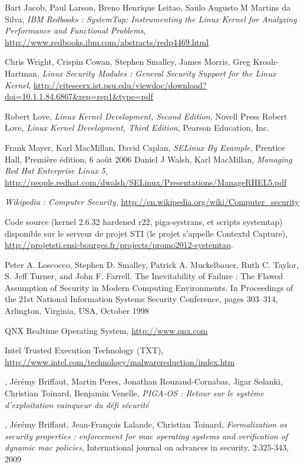 \documentclass[pdftex,a4paper,titlepage,11pt]{article}
\begin{document}
\begin{thebibliography}{40}

 Bart Jacob, Paul Larson, Breno Henrique Leitao, Saulo Augusto M Martins da Silva, \textit{IBM Redbooks : SystemTap: Instrumenting the Linux Kernel for Analyzing Performance and Functional Problems}, \url{http://www.redbooks.ibm.com/abstracts/redp4469.html}

 Chris Wright, Crispin Cowan, Stephen Smalley, James Morris, Greg Kroah-Hartman, \textit{Linux Security Modules : General Security Support for the Linux Kernel}, \url{http://citeseerx.ist.psu.edu/viewdoc/download?doi=10.1.1.84.6867&rep=rep1&type=pdf}

 Robert Love, \textit{Linux Kernel Development, Second Edition}, Novell Press
 Robert Love, \textit{Linux Kernel Development, Third Edition}, Pearson Education, Inc.

 Frank Mayer, Karl MacMillan, David Caplan, \textit{SELinux By Example}, Prentice Hall, Première édition, 6 août 2006
 Daniel J Walsh, Karl MacMillan, \textit{Managing Red Hat Enterprise Linux 5}, \url{http://people.redhat.com/dwalsh/SELinux/Presentations/ManageRHEL5.pdf}

 \textit{Wikipedia : Computer Security}, \url{http://en.wikipedia.org/wiki/Computer_security}

 Code source (kernel 2.6.32 hardened r22, piga-systrans, et scripts systemtap) disponible sur le serveur de projet STI (le projet s'appelle Contextd Capture), \url{http://projetsti.ensi-bourges.fr/projects/promo2012-systemtap}.

 Peter A. Loscocco, Stephen D. Smalley, Patrick A. Muckelbauer, Ruth C. Taylor, S. Jeff Turner, and John F. Farrell. The Inevitability of Failure : The Flawed Assumption of Security in Modern Computing Environments. In Proceedings of the 21st National Information Systems Security Conference, pages 303–314, Arlington, Virginia, USA, October 1998

 QNX Realtime Operating System, \url{http://www.qnx.com}

 Intel Trusted Execution Technology (TXT), \url{http://www.intel.com/technology/malwarereduction/index.htm}

, Jérémy Briffaut, Martin Peres, Jonathan Rouzaud-Cornabas, Jigar Solanki, Christian Toinard, Benjamin Venelle, \textit{PIGA-OS : Retour sur le système d'exploitation vainqueur du défi sécurité}

, Jérémy Briffaut, Jean-François Lalande, Christian Toinard, \textit{Formalization os security properties : enforcement for mac operating systems and verification of dynamic mac policies}, International journal on advances in security, 2:325-343, 2009

\end{thebibliography}

\end{document}
